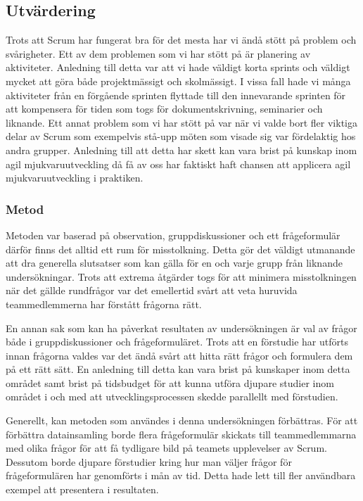 \subsection{Utvärdering}
Trots att Scrum har fungerat bra för det mesta har vi ändå stött på problem och svårigheter. Ett av dem problemen som vi har stött på är planering av aktiviteter. Anledning till detta var att vi hade väldigt korta sprints och väldigt mycket att göra både projektmässigt och skolmässigt. I vissa fall hade vi många aktiviteter från en förgående sprinten flyttade till den innevarande sprinten för att kompensera för tiden som togs för dokumentskrivning, seminarier och liknande. Ett annat problem som vi har stött på var när vi valde bort fler viktiga delar av Scrum som exempelvis stå-upp möten som visade sig var fördelaktig hos andra grupper. Anledning till att detta har skett kan vara brist på kunskap inom agil mjukvaruutveckling då få av oss har faktiskt haft chansen att applicera agil mjukvaruutveckling i praktiken. 

\subsubsection{Metod}
Metoden var baserad på observation, gruppdiskussioner och  ett frågeformulär därför finns det alltid ett rum för misstolkning. Detta gör det väldigt utmanande att dra generella slutsatser som kan gälla för en och varje grupp från liknande undersökningar. Trots att extrema åtgärder togs för att minimera misstolkningen när det gällde rundfrågor var det emellertid svårt att veta huruvida teammedlemmerna har förstått frågorna rätt.

En annan sak som kan ha påverkat resultaten av undersökningen är val av frågor både i gruppdiskussioner och frågeformuläret. Trots att en förstudie har utförts innan frågorna valdes var det ändå svårt att hitta rätt frågor och formulera dem på ett rätt sätt. En anledning till detta kan vara brist på kunskaper inom detta området samt brist på tidsbudget för att kunna utföra djupare studier inom området i och med att utvecklingsprocessen skedde parallellt med förstudien. 

Generellt, kan metoden som användes i denna undersökningen förbättras. För att förbättra datainsamling borde flera frågeformulär skickats till teammedlemmarna med olika frågor för att få tydligare bild på teamets upplevelser av Scrum. Dessutom borde djupare förstudier kring hur man väljer frågor för frågeformulären har genomförts i mån av tid. Detta hade lett till fler användbara exempel att presentera i resultaten. 

